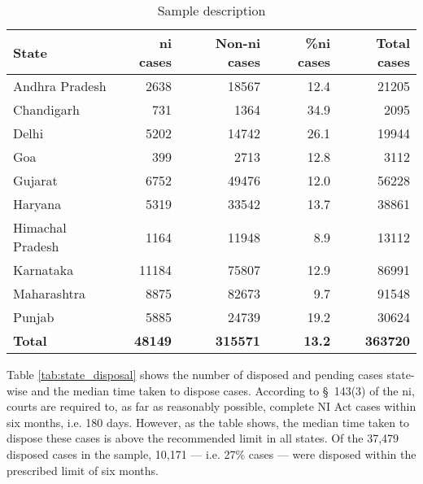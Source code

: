 {\footnotesize \begin{longtable}{@{}lrrr|r@{}}
\caption{Sample description}
\label{tab:sample_desc}\\
\toprule
\textbf{State} & \textbf{\gls{ni} cases} & \textbf{Non-\gls{ni} cases} & \textbf{\%\gls{ni} cases} & \textbf{Total cases}\\ \midrule
\endhead
Andhra Pradesh & 2638 & 18567 & 12.4 & 21205\\
Chandigarh & 731 & 1364 & 34.9 & 2095\\
Delhi & 5202 & 14742 & 26.1 & 19944\\
Goa & 399 & 2713 & 12.8 & 3112\\
Gujarat & 6752 & 49476 & 12.0 & 56228\\
Haryana & 5319 & 33542 & 13.7 & 38861\\
Himachal Pradesh & 1164 & 11948 & 8.9 & 13112\\
Karnataka & 11184 & 75807 & 12.9 & 86991\\
Maharashtra & 8875 & 82673 & 9.7 & 91548\\
Punjab & 5885 & 24739 & 19.2 & 30624\\
\midrule
\textbf{Total} & \textbf{48149} & \textbf{315571} & \textbf{13.2} & \textbf{363720}\\ \bottomrule
\end{longtable}
}

Table \ref{tab:state_disposal} shows the number of disposed and pending cases state-wise and the median time taken to dispose cases. According to \S~143(3) of the \gls{ni}, courts are required to, as far as reasonably possible, complete NI Act cases within six months, i.e. 180 days. However, as the table shows, the median time taken to dispose these cases is above the recommended limit in all states. Of the 37,479 disposed cases in the sample, 10,171 --- i.e. 27\% cases --- were disposed within the prescribed limit of six months.

